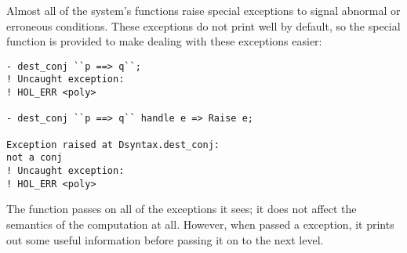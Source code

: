Almost all of the \HOL{} system's functions raise special
 exceptions to signal abnormal or erroneous conditions.
These exceptions do not print well by default, so the special
 function is provided to make dealing with these exceptions
easier:

\begin{session}\begin{verbatim}
- dest_conj ``p ==> q``;
! Uncaught exception:
! HOL_ERR <poly>

- dest_conj ``p ==> q`` handle e => Raise e;

Exception raised at Dsyntax.dest_conj:
not a conj
! Uncaught exception:
! HOL_ERR <poly>
\end{verbatim}\end{session}

\noindent The  function passes on all of the exceptions it
sees; it does not affect the semantics of the computation at all.
However, when passed a  exception, it prints out some
useful information before passing it on to the next level.







